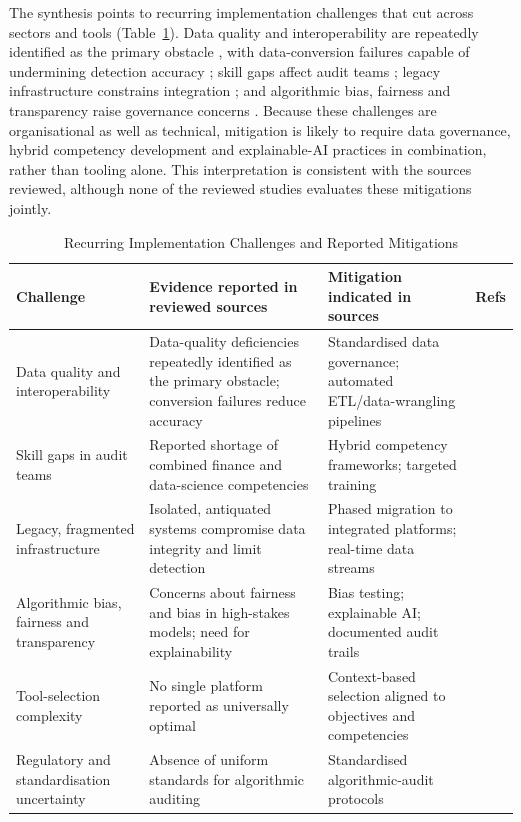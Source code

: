 \documentclass[conference]{IEEEtran}
\begin{document}
The synthesis points to recurring implementation challenges that cut across sectors and tools (Table~\ref{tab:challenges}). Data quality and interoperability are repeatedly identified as the primary obstacle \cite{b15}, with data-conversion failures capable of undermining detection accuracy \cite{b25}; skill gaps affect audit teams \cite{b16}; legacy infrastructure constrains integration \cite{b49}; and algorithmic bias, fairness and transparency raise governance concerns \cite{b17,b46,b13}. Because these challenges are organisational as well as technical, mitigation is likely to require data governance, hybrid competency development and explainable-AI practices in combination, rather than tooling alone. This interpretation is consistent with the sources reviewed, although none of the reviewed studies evaluates these mitigations jointly.

\begin{table}[!t]
\caption{Recurring Implementation Challenges and Reported Mitigations}
\label{tab:challenges}
\centering
\scriptsize
\setlength{\tabcolsep}{4pt}
\begin{tabular}{p{} p{} p{} p{}}
\toprule
\textbf{Challenge} & \textbf{Evidence reported in reviewed sources} & \textbf{Mitigation indicated in sources} & \textbf{Refs} \\
\midrule
Data quality and interoperability & Data-quality deficiencies repeatedly identified as the primary obstacle; conversion failures reduce accuracy & Standardised data governance; automated ETL/data-wrangling pipelines & \cite{b15,b25,b60} \\
Skill gaps in audit teams & Reported shortage of combined finance and data-science competencies & Hybrid competency frameworks; targeted training & \cite{b16,b55} \\
Legacy, fragmented infrastructure & Isolated, antiquated systems compromise data integrity and limit detection & Phased migration to integrated platforms; real-time data streams & \cite{b49,b53} \\
Algorithmic bias, fairness and transparency & Concerns about fairness and bias in high-stakes models; need for explainability & Bias testing; explainable AI; documented audit trails & \cite{b17,b13} \\
Tool-selection complexity & No single platform reported as universally optimal & Context-based selection aligned to objectives and competencies & \cite{b12} \\
Regulatory and standardisation uncertainty & Absence of uniform standards for algorithmic auditing & Standardised algorithmic-audit protocols & \cite{b13} \\
\bottomrule
\end{tabular}
\end{table}
\end{document}
